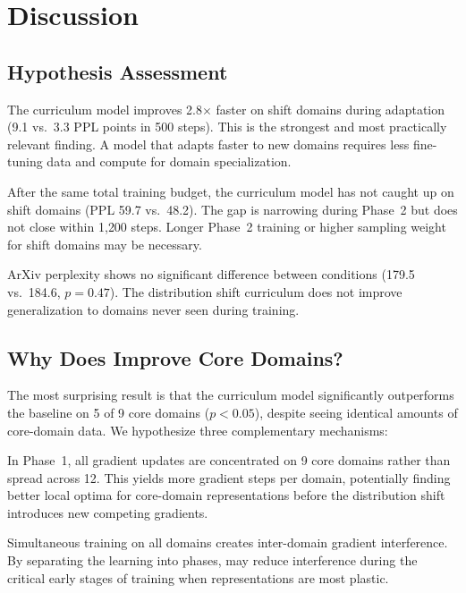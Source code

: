 \section{Discussion}
\label{sec:discussion}

\subsection{Hypothesis Assessment}

 The curriculum model improves 2.8$\times$ faster on shift domains during adaptation (9.1 vs.\ 3.3 PPL points in 500 steps). This is the strongest and most practically relevant finding. A model that adapts faster to new domains requires less fine-tuning data and compute for domain specialization.

 After the same total training budget, the curriculum model has not caught up on shift domains (PPL 59.7 vs.\ 48.2). The gap is narrowing during Phase~2 but does not close within 1{,}200 steps. Longer Phase~2 training or higher sampling weight for shift domains may be necessary.

 ArXiv perplexity shows no significant difference between conditions (179.5 vs.\ 184.6, $p = 0.47$). The distribution shift curriculum does not improve generalization to domains never seen during training.

\subsection{Why Does \dsc Improve Core Domains?}

The most surprising result is that the curriculum model significantly outperforms the baseline on 5 of 9 core domains ($p < 0.05$), despite seeing identical amounts of core-domain data. We hypothesize three complementary mechanisms:

 In Phase~1, all gradient updates are concentrated on 9 core domains rather than spread across 12. This yields more gradient steps per domain, potentially finding better local optima for core-domain representations before the distribution shift introduces new competing gradients.

 Simultaneous training on all domains creates inter-domain gradient interference. By separating the learning into phases, \dsc may reduce interference during the critical early stages of training when representations are most plastic.

